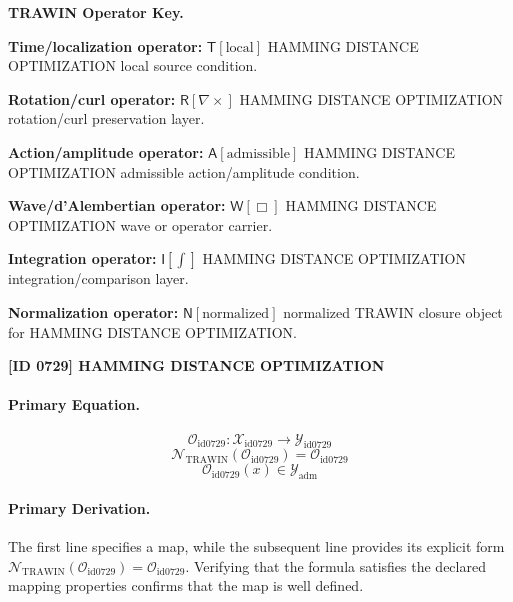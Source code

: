 \par\vspace{0.45\baselineskip}
\noindent\begin{minipage}[t]{\linewidth}
\begingroup
\small
\raggedright
\textbf{TRAWIN Operator Key.}\par
\noindent\textbf{Time/localization operator:} $\mathsf{T}\!\left[\mathrm{local}\right]$ HAMMING DISTANCE OPTIMIZATION local source condition.\par
\noindent\textbf{Rotation/curl operator:} $\mathsf{R}\!\left[\nabla\times\right]$ HAMMING DISTANCE OPTIMIZATION rotation/curl preservation layer.\par
\noindent\textbf{Action/amplitude operator:} $\mathsf{A}\!\left[\mathrm{admissible}\right]$ HAMMING DISTANCE OPTIMIZATION admissible action/amplitude condition.\par
\noindent\textbf{Wave/d'Alembertian operator:} $\mathsf{W}\!\left[\Box\right]$ HAMMING DISTANCE OPTIMIZATION wave or operator carrier.\par
\noindent\textbf{Integration operator:} $\mathsf{I}\!\left[\int\right]$ HAMMING DISTANCE OPTIMIZATION integration/comparison layer.\par
\noindent\textbf{Normalization operator:} $\mathsf{N}\!\left[\mathrm{normalized}\right]$ normalized TRAWIN closure object for HAMMING DISTANCE OPTIMIZATION.\par
\endgroup
\end{minipage}

\clearpage
\noindent\textbf{[ID 0729] HAMMING DISTANCE OPTIMIZATION}\par
\vspace{0.35em}
\paragraph{Primary Equation.}
\[
\mathcal{O}_{\mathrm{id0729}}:\mathcal{X}_{\mathrm{id0729}}\longrightarrow\mathcal{Y}_{\mathrm{id0729}}
\]
\[
\mathcal{N}_{\mathrm{TRAWIN}}(\mathcal{O}_{\mathrm{id0729}})=\mathcal{O}_{\mathrm{id0729}}
\]
\[
\mathcal{O}_{\mathrm{id0729}}(x)\in\mathcal{Y}_{\mathrm{adm}}
\]

\paragraph{Primary Derivation.}
The first line specifies a map, while the subsequent line provides its explicit form \( \mathcal{N}_{\mathrm{TRAWIN}}(\mathcal{O}_{\mathrm{id0729}})=\mathcal{O}_{\mathrm{id0729}} \). Verifying that the formula satisfies the declared mapping properties confirms that the map is well defined.
